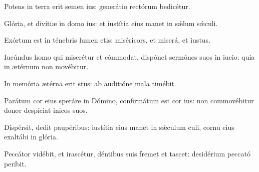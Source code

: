 \item {}

\item Potens in terra erit semen ius:\psstar{} generátio rectórum bedicétur.

\item Glória, et divítiæ in domo ius:\psstar{} et iustítia eius manet in sǽlum sǽculi.

\item Exórtum est in ténebris lumen ctis:\psstar{} miséricors, et miserá, et iustus.

\item Iucúndus homo qui miserétur et cómmodat,\pscross{} dispónet sermónes suos in iucio:\psstar{} quia in ætérnum non movébitur.

\item In memória ætérna erit stus:\psstar{} ab auditióne mala  timébit.

\item Parátum cor eius speráre in Dómino,\pscross{} confirmátum est cor ius:\psstar{} non commovébitur donec despíciat inicos suos.

\item Dispérsit, dedit paupéribus:\pscross{} iustítia eius manet in sǽculum culi,\psstar{} cornu eius exaltábi in glória.

\item Peccátor vidébit, et irascétur,\pscross{} déntibus suis fremet et tascet:\psstar{} desidérium peccató períbit.